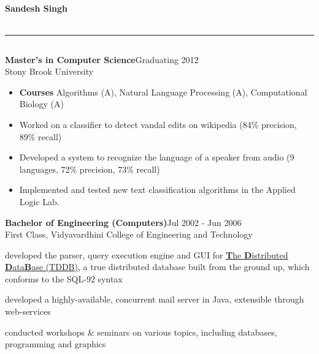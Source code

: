 \documentclass[a4paper,11pt,final]{article}
\newcommand{\resumetitle}[1]{%
  \subsection*{%
    \large\sc{#1}%
    \normalsize
  }%
  
}%
\newcommand{\eduexp}[3]{%
\textbf{#1}\hfill{#2}\normalsize\\{#3}\vspace{3pt}%
}
\newcommand{\resumedescheader}[1]{%
  \smallskip%
  \resumetitle{#1}
}%
\begin{document}
\pagestyle{empty}

\begin{center}
  \centering\Large\textbf{Sandesh Singh}\normalsize \\
   \\
  \rule[2pt]{0.99\linewidth}{.1pt}
\end{center}

\vspace{-10pt}
\resumedescheader{Education}
\eduexp
	{Master's in Computer Science}
	{Graduating 2012}
	{Stony Brook University}
\begin{itemize}
  \item \textbf{Courses} Algorithms (A), Natural Language Processing (A), Computational Biology (A)
  \item Worked on a classifier to detect vandal edits on wikipedia (84\% precision, 89\% recall)
  \item Developed a system to recognize the language of a speaker from audio (9 languages, 72\% precision, 73\% recall)
  \item Implemented and tested new text classification algorithms in the Applied Logic Lab.
\end{itemize}
\eduexp
	{Bachelor of Engineering (Computers)}
	{Jul 2002 - Jun 2006}
	{First Class, Vidyavardhini College of Engineering and Technology}
\begin{itemize*}
\item developed the parser, query execution engine and GUI for
  \href{http://tddb.sf.net} {\textbf{T}he \textbf{D}istributed
    \textbf{D}ata\textbf{B}ase (TDDB)}, a true distributed database
  built from the ground up, which conforms to the SQL-92 syntax
\item developed a highly-available, concurrent mail server in Java, extensible through web-services
\item conducted workshops \& seminars on various topics, including databases, programming and graphics
\end{itemize*}
\end{document}
